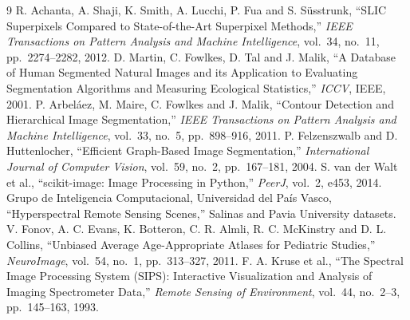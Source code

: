 {\small
\begin{thebibliography}{9}\setlength{\itemsep}{1pt}
 R. Achanta, A. Shaji, K. Smith, A. Lucchi, P. Fua and S. Süsstrunk, ``SLIC Superpixels Compared to State-of-the-Art Superpixel Methods,'' \emph{IEEE Transactions on Pattern Analysis and Machine Intelligence}, vol.~34, no.~11, pp.~2274--2282, 2012.
 D. Martin, C. Fowlkes, D. Tal and J. Malik, ``A Database of Human Segmented Natural Images and its Application to Evaluating Segmentation Algorithms and Measuring Ecological Statistics,'' \emph{ICCV}, IEEE, 2001.
 P. Arbeláez, M. Maire, C. Fowlkes and J. Malik, ``Contour Detection and Hierarchical Image Segmentation,'' \emph{IEEE Transactions on Pattern Analysis and Machine Intelligence}, vol.~33, no.~5, pp.~898--916, 2011.
 P. Felzenszwalb and D. Huttenlocher, ``Efficient Graph-Based Image Segmentation,'' \emph{International Journal of Computer Vision}, vol.~59, no.~2, pp.~167--181, 2004.
 S. van der Walt et al., ``scikit-image: Image Processing in Python,'' \emph{PeerJ}, vol.~2, e453, 2014.
 Grupo de Inteligencia Computacional, Universidad del País Vasco, ``Hyperspectral Remote Sensing Scenes,'' Salinas and Pavia University datasets.
 V. Fonov, A. C. Evans, K. Botteron, C. R. Almli, R. C. McKinstry and D. L. Collins, ``Unbiased Average Age-Appropriate Atlases for Pediatric Studies,'' \emph{NeuroImage}, vol.~54, no.~1, pp.~313--327, 2011.
 F. A. Kruse et al., ``The Spectral Image Processing System (SIPS): Interactive Visualization and Analysis of Imaging Spectrometer Data,'' \emph{Remote Sensing of Environment}, vol.~44, no.~2--3, pp.~145--163, 1993.
\end{thebibliography}}

